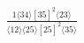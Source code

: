 \documentclass[varwidth, border=5pt]{standalone}
\begin{document}
\begin{my}
$\begin{gathered}
\scriptscriptstyle\frac{1⟨34⟩[35]^2⟨23⟩}{⟨12⟩⟨25⟩[25]^2⟨35⟩}
\end{gathered}$
\end{my}
\end{document}
